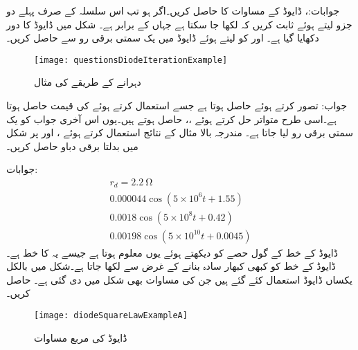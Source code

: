 جوابات:،  
ڈایوڈ کے مساوات  کا  حاصل کریں۔اگر  ہو تب اس سلسلہ کے صرف پہلے دو جزو لیتے ہوئے ثابت کریں کہ  لکھا جا سکتا ہے جہاں  کے برابر ہے۔ 
شکل  میں ڈایوڈ کا دور دکھایا گیا ہے۔ اور  کو  لیتے ہوئے ڈایوڈ میں یک سمتی برقی رو  سے حاصل کریں۔
\begin{figure}
\centering
\texttt{[image: questionsDiodeIterationExample]}
\caption{دہرانے کے طریقے کی مثال}
\label{شکل_ڈایوڈ_دہرانے_کا_طریقہ}
\end{figure}

جواب: تصور کرتے ہوئے  حاصل ہوتا ہے جسے استعمال کرتے ہوئے  کی قیمت  حاصل ہوتا ہے۔اسی طرح متواتر حل کرتے ہوئے ،،  حاصل ہوتے ہیں۔یوں اس آخری جواب کو یک سمتی برقی رو لیا جاتا ہے۔    
مندرجہ بالا مثال کے نتائج استعمال کرتے ہوئے ،  اور  پر شکل میں بدلتا برقی دباو  حاصل کریں۔

جوابات:
\begin{align*}
r_d=\SI{2.2}{\ohm}\\
0.000044 \cos (5 \times 10^{6} t+1.55)\\
0.0018 \cos (5 \times 10^{8} t+0.42)\\
0.00198 \cos (5 \times 10^{10} t+0.0045)
\end{align*}
ڈایوڈ کے خط کے گول حصے کو دیکھتے ہوئے یوں معلوم ہوتا ہے جیسے یہ  کا خط ہے۔ڈایوڈ کے خط کو کبھی کبھار سادہ بنانے کے غرض سے  لکھا جاتا ہے۔شکل  میں بالکل یکساں ڈایوڈ استعمال کئے گئے ہیں جن کی مساوات بھی شکل میں دی گئی ہے۔ حاصل کریں۔ 
\begin{figure}
\centering
\texttt{[image: diodeSquareLawExampleA]}
\caption{ڈایوڈ کی مربع مساوات}
\label{شکل_ڈایوڈ_مربع_مساوات}
\end{figure}

